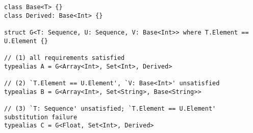 \documentclass[a4paper,headsepline,bibliography=totoc,toc=flat,fleqn,twoside=semi]{scrbook}
\theoremstyle{definition}
\theoremstyle{definition}
\theoremstyle{definition}
\begin{document}
\begin{listing}\label{unsatisfied requirements}
\begin{Verbatim}
class Base<T> {}
class Derived: Base<Int> {}

struct G<T: Sequence, U: Sequence, V: Base<Int>> where T.Element == U.Element {}

// (1) all requirements satisfied
typealias A = G<Array<Int>, Set<Int>, Derived>

// (2) `T.Element == U.Element', `V: Base<Int>' unsatisfied
typealias B = G<Array<Int>, Set<String>, Base<String>>

// (3) `T: Sequence' unsatisfied; `T.Element == U.Element' substitution failure
typealias C = G<Float, Set<Int>, Derived>
\end{Verbatim}
\end{listing}
\end{document}
